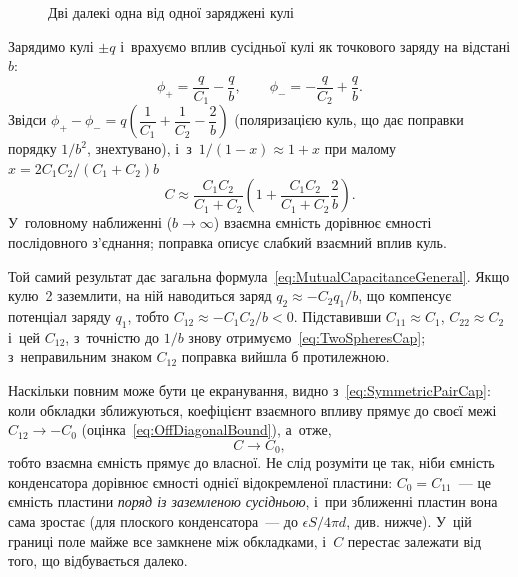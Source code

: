 	\begin{figure}\centering
		\caption{Дві далекі одна від одної заряджені кулі\label{pic:TwoSpheres}}
	\end{figure}

\begin{Extra}
	Зарядимо кулі \(\pm q\) і~врахуємо вплив сусідньої кулі як точкового заряду на
	відстані \(b\):
	\begin{equation*}
		\phi_+ = \frac{q}{C_1} - \frac{q}{b}, \qquad
		\phi_- = -\frac{q}{C_2} + \frac{q}{b}.
	\end{equation*}
	Звідси \(\phi_+-\phi_- = q\left(\dfrac1{C_1}+\dfrac1{C_2}-\dfrac2b\right)\)
	(поляризацією куль, що дає поправки порядку \(1/b^2\), знехтувано), і~з~\(1/(1-x)\approx
	1+x\) при малому \(x = 2C_1C_2/(C_1+C_2)b\)
	\begin{equation}\label{eq:TwoSpheresCap}
		C \approx \frac{C_1C_2}{C_1+C_2}\left(1 + \frac{C_1C_2}{C_1+C_2}\frac{2}{b}\right).
	\end{equation}
	У~головному наближенні (\(b\to\infty\)) взаємна ємність дорівнює ємності послідовного
	з'єднання; поправка описує слабкий взаємний вплив куль.

	Той самий результат дає загальна формула~\eqref{eq:MutualCapacitanceGeneral}. Якщо
	кулю~2 заземлити, на ній наводиться заряд \(q_2\approx -C_2q_1/b\), що компенсує
	потенціал заряду \(q_1\), тобто \(C_{12}\approx -C_1C_2/b<0\). Підставивши
	\(C_{11}\approx C_1\), \(C_{22}\approx C_2\) і~цей \(C_{12}\), з~точністю до \(1/b\)
	знову отримуємо~\eqref{eq:TwoSpheresCap}; з~неправильним знаком \(C_{12}\) поправка
	вийшла б протилежною.

Наскільки повним може бути це екранування, видно з~\eqref{eq:SymmetricPairCap}: коли
обкладки зближуються, коефіцієнт взаємного впливу прямує до своєї межі \(C_{12}\to -C_0\)
(оцінка~\eqref{eq:OffDiagonalBound}), а~отже,
\begin{equation*}
	C \to C_0,
\end{equation*}
тобто взаємна ємність прямує до власної. Не слід розуміти це так, ніби ємність
конденсатора дорівнює ємності однієї відокремленої пластини: \(C_0 = C_{11}\)~--- це
ємність пластини \emph{поряд із заземленою сусідньою}, і~при зближенні пластин вона сама
зростає (для плоского конденсатора~--- до \(\epsilon S/4\pi d\), див. нижче). У~цій
границі поле майже все замкнене між обкладками, і~\(C\) перестає залежати від того, що
відбувається далеко.
\end{Extra}



